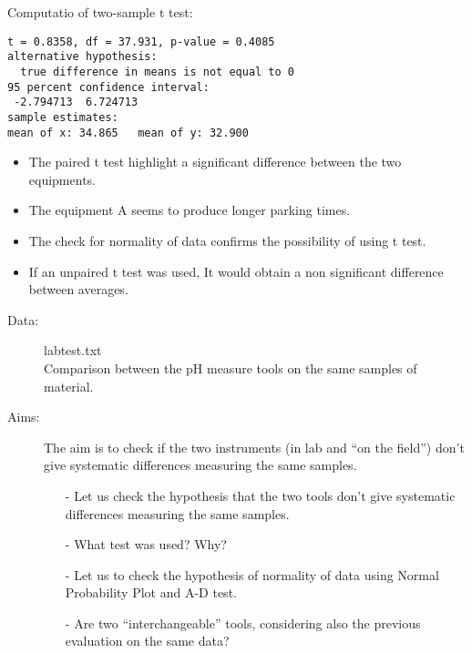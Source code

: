 \begin{frame}[fragile]
Computatio of two-sample t test:\\
  \begin{verbatim}
t = 0.8358, df = 37.931, p-value = 0.4085
alternative hypothesis: 
  true difference in means is not equal to 0
95 percent confidence interval:
 -2.794713  6.724713
sample estimates:
mean of x: 34.865   mean of y: 32.900
  \end{verbatim}
\end{frame}

\begin{frame}
  \begin{itemize}
    \item The paired t test highlight a significant difference between the two equipments.
    \vspace{0.4cm}
    \item The equipment A seems to produce longer parking times.
    \vspace{0.4cm}
    \item The check for normality of data confirms the possibility of using t test.
    \vspace{0.4cm}
    \item If an unpaired t test was used, It would obtain a non significant difference between averages.  
  \end{itemize}
\end{frame}


\begin{frame} 
  \begin{description}
    \item[Data:] labtest.txt\\ 
      Comparison between the pH measure tools on the same samples of material.
    \item[Aims:]
      \begin{small}
        The aim is to check if the two instruments (in lab and ``on the field'') don't give systematic differences measuring the same samples. 
        \begin{itemize}
          \item[-] Let us check the hypothesis that the two tools don't give systematic differences measuring the same samples.
          \item[-] What test was used? Why?
          \item[-] Let us to check the hypothesis of normality of data using Normal Probability Plot and A-D test. 
          \item[-] Are two ``interchangeable'' tools, considering also the previous evaluation on the same data?
        \end{itemize}
      \end{small}
  \end{description}
\end{frame}

